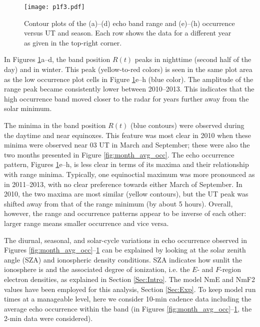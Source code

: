 \begin{figure}
\texttt{[image: p1f3.pdf]}
\caption{Contour plots of the (a)--(d) echo band range and (e)--(h) occurrence versus UT and season. Each row shows the data for a different year as given in the top-right corner.}
\label{fig:year_color}
\end{figure}

In Figures \ref{fig:year_color}a--d, the band position \(R\left(t\right)\) peaks in nighttime (second half of the day) and in winter. This peak (yellow-to-red colors) is seen in the same plot area as the low occurrence plot cells in Figure \ref{fig:year_color}e--h (blue color). The amplitude of the range peak became consistently lower between 2010--2013.  This indicates that the high occurrence band moved closer to the radar for years further away from the solar minimum.

The minima in the band position \(R\left(t\right)\) (blue contours) were observed during the daytime and near equinoxes. This feature was most clear in 2010 when these minima were observed near 03 UT in March and September; these were also the two months presented in Figure \ref{fig:month_avg_occ}. The echo occurrence pattern, Figures \ref{fig:year_color}e--h, is less clear in terms of its maxima and their relationship with range minima. Typically, one equinoctial maximum was more pronounced as in 2011--2013, with no clear preference towards either March of September. In 2010, the two maxima are most similar (yellow contours), but the UT peak was shifted away from that of the range minimum (by about 5 hours). Overall, however, the range and occurrence patterns appear to be inverse of each other: larger range means smaller occurrence and vice versa.

The diurnal, seasonal, and solar-cycle variations in echo occurrence observed in Figures \ref{fig:month_avg_occ}--\ref{fig:year_color} can be explained by looking at the solar zenith angle (SZA) and ionospheric density conditions. SZA indicates how sunlit the ionosphere is and the associated degree of ionization, i.e. the \(E\)- and \(F\)-region electron densities, as explained in Section \ref{Sec:Intro}. The model NmE and NmF2 values have been employed for this analysis, Section \ref{Sec:Exp}. To keep model run times at a manageable level, here we consider 10-min cadence data including the average echo occurrence within the band (in Figures \ref{fig:month_avg_occ}--\ref{fig:year_color}, the 2-min data were considered).




